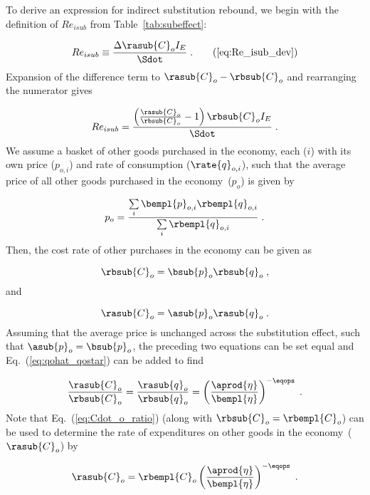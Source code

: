 To derive an expression for indirect substitution rebound,
we begin with the definition of $Re_{isub}$
from Table~\ref{tab:subeffect}:

\begin{equation}
  Re_{isub} \equiv \frac{\Delta \rasub{C}_o I_E}{\Sdot} \; .  \tag{\ref{eq:Re_isub_dev}}
\end{equation}
%
Expansion of the difference term to $\rasub{C}_o - \rbsub{C}_o$ and rearranging the numerator gives

\begin{equation} \label{eq:Re_isub_prelim}
  Re_{isub} = \frac{\left( \frac{\rasub{C}_o}{\rbsub{C}_o} - 1  \right) \rbsub{C}_o I_E} {\Sdot} \; .
\end{equation}
%
We assume a basket of other goods purchased in the economy,
each ($i$) with its own price ($p_{o,i}$) and rate of consumption ($\rate{q}_{o,i}$),
such that the average price of all other goods purchased in the economy~($p_o$) is given by

\begin{equation}
  p_o = \frac{\sum\limits_i \bempl{p}_{o,i} \rbempl{q}_{o,i}}{\sum\limits_i \rbempl{q}_{o,i}} \; .
\end{equation}
%
Then, the cost rate of other purchases in the economy can be given as

\begin{equation}
  \rbsub{C}_o = \bsub{p}_o \rbsub{q}_o \; ,
\end{equation}
%
and

\begin{equation}
  \rasub{C}_o = \asub{p}_o \rasub{q}_o \; .
\end{equation}
%
Assuming that the average price is unchanged across the substitution effect,
such that $\asub{p}_o = \bsub{p}_o$,
the preceding two equations can be set equal and Eq.~(\ref{eq:qohat_qostar}) can be added to find

\begin{equation} \label{eq:Cdot_o_ratio}
  \frac{\rasub{C}_o}{\rbsub{C}_o} 
      = \frac{\rasub{q}_o}{\rbsub{q}_o} 
      = \left( \frac{\aprod{\eta}}{\bempl{\eta}} \right)^{-\eqops}  \; .
\end{equation}
%
Note that Eq.~(\ref{eq:Cdot_o_ratio}) 
(along with $\rbsub{C}_o = \rbempl{C}_o$)
can be used to determine the rate of expenditures 
on other goods in the economy~($\rasub{C}_o$) by

\begin{equation}
  \rasub{C}_o = \rbempl{C}_o \left( \frac{\aprod{\eta}}{\bempl{\eta}} \right)^{-\eqops} \; .
\end{equation}

